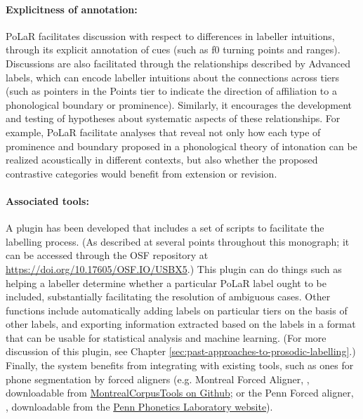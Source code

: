 \documentclass[11pt, twoside]{memoir}
\begin{document}
\paragraph{Explicitness of annotation:}
PoLaR facilitates discussion with respect to differences in labeller intuitions, through its explicit annotation of cues (such as f0 turning points and ranges). Discussions are also facilitated through the relationships described by Advanced labels, which can encode labeller intuitions about the connections across tiers (such as pointers in the Points tier to indicate the direction of affiliation to a phonological boundary or prominence). Similarly, it encourages the development and testing of hypotheses about systematic aspects of these relationships. For example, PoLaR facilitate analyses that reveal not only how each type of prominence and boundary proposed in a phonological theory of intonation can be realized acoustically in different contexts, but also whether the proposed contrastive categories would benefit from extension or revision.

\paragraph{Associated tools:}
A plugin has been developed that includes a set of scripts to facilitate the labelling process. (As described at several points throughout this monograph; it can be accessed through the OSF repository at \url{https://doi.org/10.17605/OSF.IO/USBX5}.) This plugin can do things such as helping a labeller determine whether a particular PoLaR label ought to be included, substantially facilitating the resolution of ambiguous cases. Other functions include automatically adding labels on particular tiers on the basis of other labels, and exporting information extracted based on the labels in a format that can be usable for statistical analysis and machine learning.  (For more discussion of this plugin, see Chapter \ref{sec:past-approaches-to-prosodic-labelling}.) Finally, the system benefits from integrating with existing tools, such as ones for phone segmentation by forced aligners (e.g. Montreal Forced Aligner, \citealt{mcauliffe-19}, downloadable from \href{https://github.com/MontrealCorpusTools/Montreal-Forced-Aligner}{MontrealCorpusTools on Github}; or the Penn Forced aligner, \citealt{yuanliberman08}, downloadable from the \href{https://web.sas.upenn.edu/phonetics-lab/facilities/}{Penn Phonetics Laboratory website}).
\end{document}
